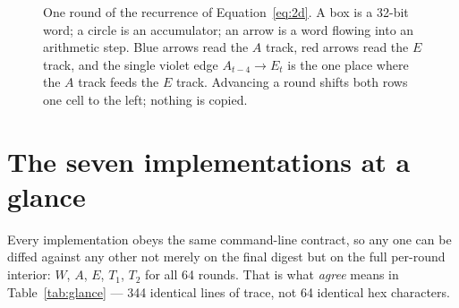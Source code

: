 \documentclass[11pt,a4paper]{article}
\begin{document}
\begin{figure}[t]
\caption{One round of the recurrence of Equation~\eqref{eq:2d}. A box is a
32-bit word; a circle is an accumulator; an arrow is a word flowing into an
arithmetic step. Blue arrows read the $A$ track, red arrows read the $E$
track, and the single violet edge $A_{t-4} \rightarrow E_t$ is the one place
where the $A$ track feeds the $E$ track. Advancing a round shifts both rows
one cell to the left; nothing is copied.}
\label{fig:tracks}
\end{figure}

\section{The seven implementations at a glance}
\label{sec:glance}

Every implementation obeys the same command-line contract, so any one can be
diffed against any other not merely on the final digest but on the full
per-round interior: $W$, $A$, $E$, $T_1$, $T_2$ for all 64 rounds. That is
what \emph{agree} means in Table~\ref{tab:glance} --- 344 identical lines of
trace, not 64 identical hex characters.
\end{document}
